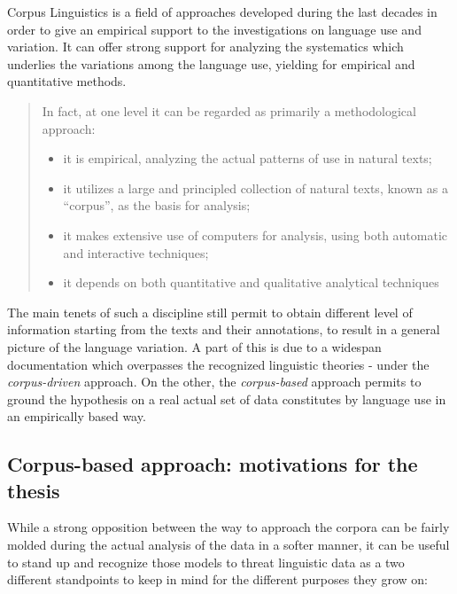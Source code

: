 \documentclass[
  a4paper,
  twoside,
  12pt,
  chapterprefix=false,
  bibliography=totocnumbered,
  listof=flat]{scrbook}
\providecommand{\tightlist}{%
  \setlength{\itemsep}{0pt}\setlength{\parskip}{0pt}}
\begin{document}
Corpus Linguistics is a field of approaches developed during the last decades in order to give an empirical support to the investigations on language use and variation. It can offer strong support for analyzing the systematics which underlies the variations among the language use, yielding for empirical and quantitative methods.

\begin{quote}
In fact, at one level it can be regarded as primarily a methodological approach:

\begin{itemize}
\tightlist
\item
  it is empirical, analyzing the actual patterns of use in natural texts;
\item
  it utilizes a large and principled collection of natural texts, known as a ``corpus'', as the basis for analysis;
\item
  it makes extensive use of computers for analysis, using both automatic and interactive techniques;
\item
  it depends on both quantitative and qualitative analytical techniques
  \citep{biber1998}
\end{itemize}
\end{quote}

The main tenets of such a discipline still permit to obtain different level of information starting from the texts and their annotations, to result in a general picture of the language variation. A part of this is due to a widespan documentation which overpasses the recognized linguistic theories - under the \emph{corpus-driven} approach.
On the other, the \emph{corpus-based} approach permits to ground the hypothesis on a real actual set of data constitutes by language use in an empirically based way.

\hypertarget{corpus-based-approach-motivations-for-the-thesis}{%
\subsection{Corpus-based approach: motivations for the thesis}\label{corpus-based-approach-motivations-for-the-thesis}}

While a strong opposition between the way to approach the corpora can be fairly molded during the actual analysis of the data in a softer manner, it can be useful to stand up and recognize those models to threat linguistic data as a two different standpoints to keep in mind for the different purposes they grow on:
\end{document}
